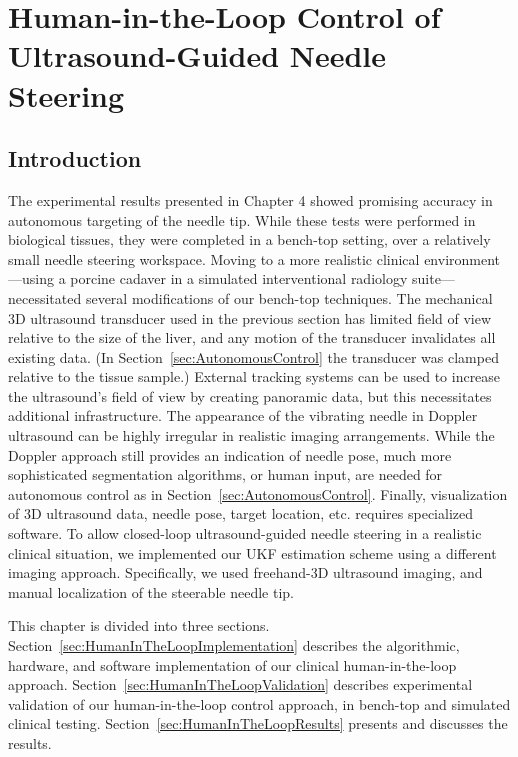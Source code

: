 \chapter[Human-in-the-Loop Control]{Human-in-the-Loop Control of Ultrasound-Guided Needle Steering}

\section{Introduction}
The experimental results presented in Chapter 4 showed promising accuracy in autonomous targeting of the needle tip. While these tests were performed in biological tissues, they were completed in a bench-top setting, over a relatively small needle steering workspace. Moving to a more realistic clinical environment---using a porcine cadaver in a simulated interventional radiology suite---necessitated several modifications of our bench-top techniques. The mechanical 3D ultrasound transducer used in the previous section has limited field of view relative to the size of the liver, and any motion of the transducer invalidates all existing data. (In Section~\ref{sec:AutonomousControl} the transducer was clamped relative to the tissue sample.) External tracking systems can be used to increase the ultrasound's field of view by creating panoramic data, but this necessitates additional infrastructure. The appearance of the vibrating needle in Doppler ultrasound can be highly irregular in realistic imaging arrangements. While the Doppler approach still provides an indication of needle pose, much more sophisticated segmentation algorithms, or human input, are needed for autonomous control as in Section~\ref{sec:AutonomousControl}. Finally, visualization of 3D ultrasound data, needle pose, target location, etc. requires specialized software. To allow closed-loop ultrasound-guided needle steering in a realistic clinical situation, we implemented our UKF estimation scheme using a different imaging approach. Specifically, we used freehand-3D ultrasound imaging, and manual localization of the steerable needle tip. 

This chapter is divided into three sections. Section~\ref{sec:HumanInTheLoopImplementation} describes the algorithmic, hardware, and software implementation of our clinical human-in-the-loop approach. Section~\ref{sec:HumanInTheLoopValidation} describes experimental validation of our human-in-the-loop control approach, in bench-top and simulated clinical testing. Section~\ref{sec:HumanInTheLoopResults} presents and discusses the results.

